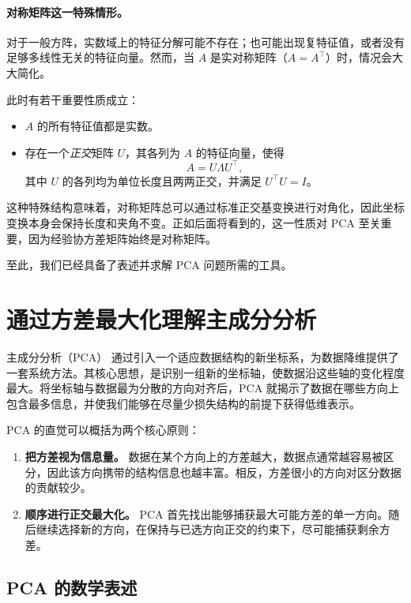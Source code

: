 \paragraph{对称矩阵这一特殊情形。}
对于一般方阵，实数域上的特征分解可能不存在；也可能出现复特征值，或者没有足够多线性无关的特征向量。然而，当 \(A\) 是实对称矩阵（\(A=A^\top\)）时，情况会大大简化。

此时有若干重要性质成立：
\begin{itemize}
    \item \(A\) 的所有特征值都是实数。
    \item 存在一个\emph{正交}矩阵 \(U\)，其各列为 \(A\) 的特征向量，使得
    \[
    A = U \Lambda U^\top,
    \]
    其中 \(U\) 的各列均为单位长度且两两正交，并满足 \(U^\top U = I\)。
\end{itemize}

这种特殊结构意味着，对称矩阵总可以通过标准正交基变换进行对角化，因此坐标变换本身会保持长度和夹角不变。正如后面将看到的，这一性质对 PCA 至关重要，因为经验协方差矩阵始终是对称矩阵。

至此，我们已经具备了表述并求解 PCA 问题所需的工具。

\section{通过方差最大化理解主成分分析}

主成分分析（PCA）\cite{pearson1901,hotelling1933} 通过引入一个适应数据结构的新坐标系，为数据降维提供了一套系统方法。其核心思想，是识别一组新的坐标轴，使数据沿这些轴的变化程度最大。将坐标轴与数据最为分散的方向对齐后，PCA 就揭示了数据在哪些方向上包含最多信息，并使我们能够在尽量少损失结构的前提下获得低维表示。

PCA 的直觉可以概括为两个核心原则：
\begin{enumerate}
    \item \textbf{把方差视为信息量。}  
    数据在某个方向上的方差越大，数据点通常越容易被区分，因此该方向携带的结构信息也越丰富。相反，方差很小的方向对区分数据的贡献较少。

    \item \textbf{顺序进行正交最大化。}  
    PCA 首先找出能够捕获最大可能方差的单一方向。随后继续选择新的方向，在保持与已选方向正交的约束下，尽可能捕获剩余方差。
\end{enumerate}

\subsection{PCA 的数学表述}

